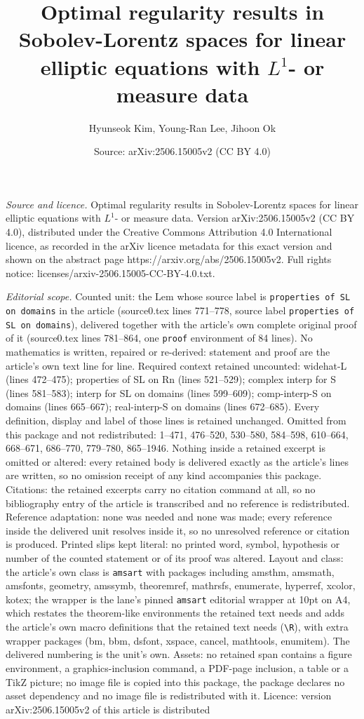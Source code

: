 \documentclass[10pt,a4paper]{amsart}
\title[Optimal regularity results in Sobolev-Lorentz spaces for lin]{Optimal regularity results in Sobolev-Lorentz spaces for linear elliptic equations with $L^1$- or measure data}
\author{Hyunseok Kim, Young-Ran Lee, Jihoon Ok}
\date{Source: arXiv:2506.15005v2 (CC BY 4.0)}
\begin{document}
\maketitle

\noindent\emph{Source and licence.} Optimal regularity results in Sobolev-Lorentz spaces for linear elliptic equations with $L^1$- or measure data. Version arXiv:2506.15005v2 (CC BY 4.0), distributed under the Creative Commons Attribution 4.0 International licence, as recorded in the arXiv licence metadata for this exact version and shown on the abstract page https://arxiv.org/abs/2506.15005v2. Full rights notice: licenses/arxiv-2506.15005-CC-BY-4.0.txt.\par\smallskip

\noindent\textit{Editorial scope.} Counted unit: the Lem whose source label is \texttt{properties of SL on domains} in the article (source0.tex lines 771--778, source label \texttt{properties of SL on domains}), delivered together with the article's own complete original proof of it (source0.tex lines 781--864, one \texttt{proof} environment of 84 lines). No mathematics is written, repaired or re-derived: statement and proof are the article's own text line for line. Required context retained uncounted: widehat-L (lines 472--475); properties of SL on Rn (lines 521--529); complex interp for S (lines 581--583); interp for SL on domains (lines 599--609); comp-interp-S on domains (lines 665--667); real-interp-S on domains (lines 672--685). Every definition, display and label of those lines is retained unchanged. Omitted from this package and not redistributed: 1--471, 476--520, 530--580, 584--598, 610--664, 668--671, 686--770, 779--780, 865--1946. Nothing inside a retained excerpt is omitted or altered: every retained body is delivered exactly as the article's lines are written, so no omission receipt of any kind accompanies this package. Citations: the retained excerpts carry no citation command at all, so no bibliography entry of the article is transcribed and no reference is redistributed. Reference adaptation: none was needed and none was made; every reference inside the delivered unit resolves inside it, so no unresolved reference or citation is produced. Printed slips kept literal: no printed word, symbol, hypothesis or number of the counted statement or of its proof was altered. Layout and class: the article's own class is \texttt{amsart} with packages including amsthm, amsmath, amsfonts, geometry, amssymb, theoremref, mathrsfs, enumerate, hyperref, xcolor, kotex; the wrapper is the lane's pinned \texttt{amsart} editorial wrapper at 10pt on A4, which restates the theorem-like environments the retained text needs and adds the article's own macro definitions that the retained text needs (\texttt{\textbackslash R}), with extra wrapper packages (bm, bbm, dsfont, xspace, cancel, mathtools, enumitem). The delivered numbering is the unit's own. Assets: no retained span contains a figure environment, a graphics-inclusion command, a PDF-page inclusion, a table or a TikZ picture; no image file is copied into this package, the package declares no asset dependency and no image file is redistributed with it. Licence: version arXiv:2506.15005v2 of this article is distributed 
\end{document}
